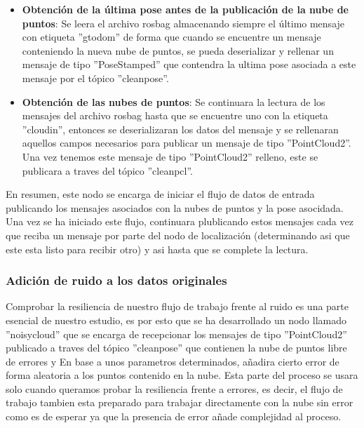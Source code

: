 \documentclass[12pt, a4paper, twoside]{article}
\begin{document}
\begin{itemize}
  \begin{itemize}
    \item \textbf{Obtención de la última pose antes de la publicación de la nube de puntos}: Se leera el archivo rosbag almacenando siempre el último mensaje con etiqueta 
    ''gt\textunderscore odom'' de forma que cuando se encuentre un mensaje conteniendo la nueva nube de puntos, se pueda deserializar y rellenar un mensaje de tipo ''PoseStamped'' 
    que contendra la ultima pose asociada a este mensaje por el tópico ''clean\textunderscore pose''.
    \item \textbf{Obtención de las nubes de puntos}: Se continuara la lectura de los mensajes del archivo rosbag hasta que se encuentre uno con la etiqueta 
    ''cloud\textunderscore in'', entonces se deserializaran los datos del mensaje y se rellenaran aquellos campos necesarios para publicar un mensaje de tipo ''PointCloud2''.
    Una vez tenemos este mensaje de tipo ''PointCloud2'' relleno, este se publicara a traves del tópico ''clean\textunderscore pcl''.
  \end{itemize}
\end{itemize}
En resumen, este nodo se encarga de iniciar el flujo de datos de entrada publicando los mensajes asociados con la nubes de puntos y la pose asocidada. Una vez se ha iniciado
este flujo, continuara plublicando estos mensajes cada vez que reciba un mensaje por parte del nodo de localización (determinando asi que este esta listo para recibir otro)
y asi hasta que se complete la lectura.

\subsubsection{Adición de ruido a los datos originales}
Comprobar la resiliencia de nuestro flujo de trabajo frente al ruido es una parte esencial de nuestro estudio, es por esto que se ha desarrollado un nodo llamado
''noisy\textunderscore cloud'' que se encarga de recepcionar los mensajes de tipo ''PointCloud2'' publicado a traves del tópico ''clean\textunderscore pose'' que 
contienen la nube de puntos libre de errores y En base a unos parametros determinados, añadira cierto error de forma aleatoria a los puntos contenido en la nube. 
Esta parte del proceso se usara solo cuando queramos probar la resiliencia frente a errores, es decir, el flujo de trabajo tambien esta preparado para trabajar 
directamente con la nube sin error como es de esperar ya que la presencia de error añade complejidad al proceso.
\end{document}
